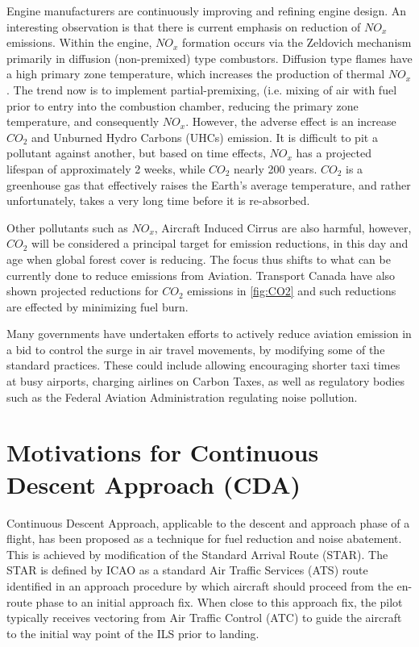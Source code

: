 \documentclass{aer1315-pretty}
\begin{document}
Engine manufacturers are continuously improving and refining engine design. An interesting observation is that there is current emphasis on reduction of $NO_x$ emissions. Within the engine, $NO_x$ formation occurs via the Zeldovich mechanism primarily in diffusion (non-premixed) type combustors. Diffusion type flames have a high primary zone temperature, which increases the production of thermal $NO_x$. The trend now is to implement partial-premixing, (i.e. mixing of air with fuel prior to entry into the combustion chamber, reducing the primary zone temperature, and consequently $NO_x$. However, the adverse effect is an increase $CO_2$ and Unburned Hydro Carbons (UHCs) emission. It is difficult to pit a pollutant against another, but based on time effects, $NO_x$ has a projected lifespan of approximately 2 weeks, while $CO_2$ nearly 200 years. $CO_2$ is a greenhouse gas that effectively raises the Earth's average temperature, and rather unfortunately, takes a very long time before it is re-absorbed.\par

Other pollutants such as $NO_x$, Aircraft Induced Cirrus are also harmful, however, $CO_2$ will be considered a principal target for emission reductions, in this day and age when global forest cover is reducing. The focus thus shifts to what can be currently done to reduce emissions from Aviation. Transport Canada have also shown projected reductions for $CO_2$ emissions in \ref{fig:CO2} and such reductions are effected by minimizing fuel burn.\par

Many governments have undertaken efforts to actively reduce aviation emission in a bid to control the surge in air travel movements, by modifying some of the standard practices. These could include allowing encouraging shorter taxi times at busy airports, charging airlines on Carbon Taxes, as well as regulatory bodies such as the Federal Aviation Administration regulating noise pollution.\par 

\section{Motivations for Continuous Descent Approach (CDA)}
\label{sec:CDA}
Continuous Descent Approach, applicable to the descent and approach phase of a flight, has been proposed as a technique for fuel reduction and noise abatement. This is achieved by modification of the Standard Arrival Route (STAR). The STAR is defined by ICAO as a standard Air Traffic Services (ATS) route identified in an approach procedure by which aircraft should proceed from the en-route phase to an initial approach fix. When close to this approach fix, the pilot typically receives vectoring from Air Traffic Control (ATC) to guide the aircraft to the initial way point of the ILS prior to landing.\par
\end{document}

